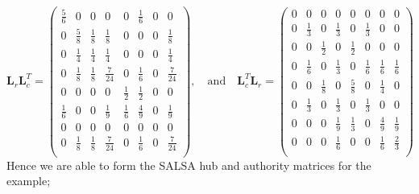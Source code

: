 \documentclass[11pt]{report}
\begin{document}
\begin{equation*}
\textbf{L}_r\textbf{L}_c^T=\left(
\begin{array}{cccccccc}
\frac{5}{6} & 0 & 0 & 0 & 0 & \frac{1}{6} & 0 & 0 \\
0 & \frac{5}{8} & \frac{1}{8} & \frac{1}{8} & 0 & 0 & 0 & \frac{1}{8} \\
0 & \frac{1}{4} & \frac{1}{4} & \frac{1}{4} & 0 & 0 & 0 & \frac{1}{4} \\
0 & \frac{1}{8} & \frac{1}{8} & \frac{7}{24} & 0 & \frac{1}{6} & 0 & \frac{7}{24} \\
0 & 0 & 0 & 0 & \frac{1}{2} & \frac{1}{2} & 0 & 0\\
\frac{1}{6} & 0 & 0 & \frac{1}{9} & \frac{1}{6} & \frac{4}{9} & 0 & \frac{1}{9} \\
0 & 0 & 0 & 0 & 0 & 0 & 0 & 0 \\
0 & \frac{1}{8} & \frac{1}{8} & \frac{7}{24} & 0 & \frac{1}{6} & 0 & \frac{7}{24} \\
\end{array}
\right)
\mathrm{,}\quad\mathrm{and}\quad
\textbf{L}_c^T\textbf{L}_r=\left(
\begin{array}{cccccccc}
0 & 0 & 0 & 0 & 0 & 0 & 0 & 0 \\
0 & \frac{1}{3} & 0 & \frac{1}{3} & 0 & \frac{1}{3} & 0 & 0 \\
0 & 0 & \frac{1}{2} & 0 & \frac{1}{2} & 0 & 0 & 0 \\
0 & \frac{1}{6} & 0 & \frac{1}{3} & 0 & \frac{1}{6} & \frac{1}{6} & \frac{1}{6} \\
0 & 0 & \frac{1}{8} & 0 & \frac{5}{8} & 0 & \frac{1}{4} & 0 \\
0 & \frac{1}{3} & 0 & \frac{1}{3} & 0 & \frac{1}{3} & 0 & 0 \\
0 & 0 & 0 & \frac{1}{9} & \frac{1}{3} & 0 & \frac{4}{9} & \frac{1}{9} \\
0 & 0 & 0 & \frac{1}{6} & 0 & 0 & \frac{1}{6} & \frac{2}{3} \\
\end{array}
\right)
\end{equation*}
Hence we are able to form the SALSA hub and authority matrices for the example;
\end{document}

